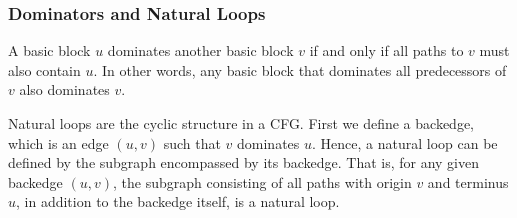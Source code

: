 



\subsubsection{Dominators and Natural Loops}

A basic block $u$ dominates another basic block $v$ if and only if all paths 
to $v$ must also contain $u$.
In other words, any basic block that dominates all predecessors of $v$ also dominates $v$.

Natural loops are the cyclic structure in a CFG.
First we define a backedge, which is an edge $(u,v)$ such that $v$ dominates $u$.
Hence, a natural loop can be defined by the subgraph encompassed by its backedge.
That is, for any given backedge $(u,v)$, the subgraph consisting of all paths with origin $v$ and terminus $u$, in addition to the backedge itself, is a natural loop.

